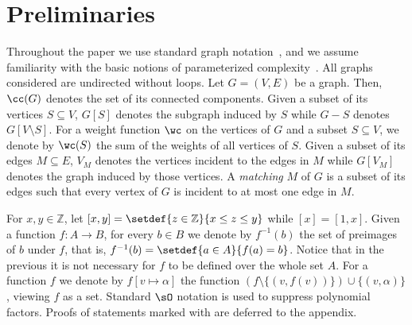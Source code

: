 \section{Preliminaries}\label{sec:preliminaries}
Throughout the paper we use standard graph notation~\cite{books/Diestel17},
and we assume familiarity with the basic notions of parameterized complexity~\cite{books/CyganFKLMPPS15}.
All graphs considered are undirected without loops.
Let $G = (V, E)$ be a graph.
Then, $\cc(G)$ denotes the set of its connected components.
Given a subset of its vertices $S \subseteq V$, $G[S]$ denotes the subgraph induced by $S$ while $G - S$ denotes $G[V \setminus S]$.
For a weight function $\wc$ on the vertices of $G$ and a subset $S \subseteq V$,
we denote by $\wc(S)$ the sum of the weights of all vertices of $S$.
Given a subset of its edges $M \subseteq E$, $V_M$ denotes the vertices incident to the edges in $M$ while $G[V_M]$ denotes the graph
induced by those vertices.
A \emph{matching} $M$ of $G$ is a subset of its edges such that every vertex of $G$ is incident to at most one edge in $M$.

For $x, y \in \mathbb{Z}$, let $[x, y] = \setdef{z \in \mathbb{Z}}{x \leq z \leq y}$ while $[x] = [1,x]$.
Given a function $f \colon A \to B$, for every $b \in B$ we denote by $f^{-1}(b)$ the set of preimages of $b$ under $f$,
that is, $f^{-1}(b) = \setdef{a \in A}{f(a) = b}$.
Notice that in the previous it is not necessary for $f$ to be defined over the whole set $A$.
For a function $f$ we denote by $f[v \mapsto \alpha]$ the function
$(f \setminus \{(v, f(v))\}) \cup \{(v, \alpha)\}$, viewing $f$ as a set.
Standard $\sO$ notation is used to suppress polynomial factors.
Proofs of statements marked with {\appsymbNote} are deferred to the appendix.

